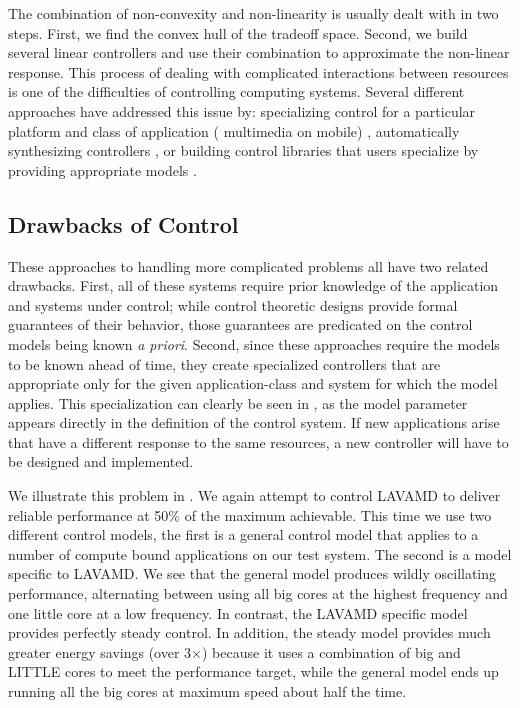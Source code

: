 The combination of non-convexity and non-linearity is usually dealt
with in two steps. First, we find the convex hull of the tradeoff
space.  Second, we build several linear controllers and use their
combination to approximate the non-linear response.  This process of
dealing with complicated interactions between resources is one of the
difficulties of controlling computing systems.  Several different
approaches have addressed this issue by: specializing control for a
particular platform and class of application (\eg{} multimedia on
mobile) \cite{METE,Agilos}, automatically synthesizing controllers
\cite{torellas,FSE2015}, or building control libraries that users
specialize by providing appropriate models \cite{POET,ControlWare}.

\subsection{Drawbacks of Control}
These approaches to handling more complicated problems all have two
related drawbacks.  First, all of these systems require prior
knowledge of the application and systems under control; while control
theoretic designs provide formal guarantees of their behavior, those
guarantees are predicated on the control models being known {\em a
  priori}. Second, since these approaches require the models to be
known ahead of time, they create specialized controllers that are
appropriate only for the given application-class and system for which
the model applies.  This specialization can clearly be seen in
, as the model parameter appears directly in the
definition of the control system.  If new applications arise that have
a different response to the same resources, a new controller will have
to be designed and implemented.

We illustrate this problem in .  We again
attempt to control LAVAMD to deliver reliable performance at 50\% of
the maximum achievable.  This time we use two different control
models, the first is a general control model that applies to a number
of compute bound applications on our test system.  The second is a
model specific to LAVAMD.  We see that the general model produces
wildly oscillating performance, alternating between using all big
cores at the highest frequency and one little core at a low frequency.
In contrast, the LAVAMD specific model provides perfectly steady
control.  In addition, the steady model provides much greater energy
savings (over 3$\times$) because it uses a combination of big and
LITTLE cores to meet the performance target, while the general model
ends up running all the big cores at maximum speed about half the
time.


